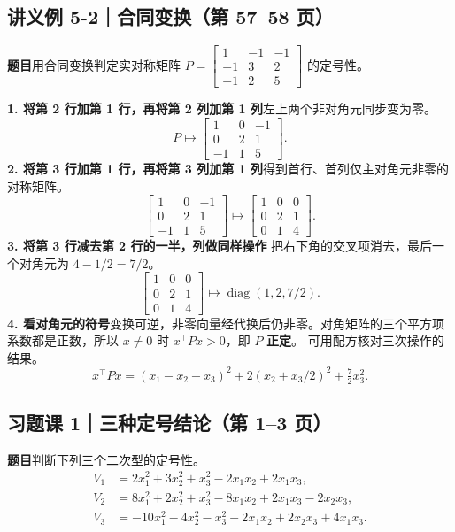 \documentclass[UTF8,a4paper,11pt,fontset=fandol]{ctexart}
\begin{document}
\subsection*{讲义例 5-2｜合同变换（第 57--58 页）}

\textbf{题目}\quad 用合同变换判定实对称矩阵 $P=\begin{bmatrix}1&-1&-1\\-1&3&2\\-1&2&5\end{bmatrix}$ 的定号性。

\textbf{1. 将第 2 行加第 1 行，再将第 2 列加第 1 列}\quad 左上两个非对角元同步变为零。
\[
  P\longmapsto
  \begin{bmatrix}1&0&-1\\0&2&1\\-1&1&5\end{bmatrix}.
\]
\textbf{2. 将第 3 行加第 1 行，再将第 3 列加第 1 列}\quad 得到首行、首列仅主对角元非零的对称矩阵。
\[
  \begin{bmatrix}1&0&-1\\0&2&1\\-1&1&5\end{bmatrix}
  \longmapsto
  \begin{bmatrix}1&0&0\\0&2&1\\0&1&4\end{bmatrix}.
\]
\textbf{3. 将第 3 行减去第 2 行的一半，列做同样操作}\quad
把右下角的交叉项消去，最后一个对角元为 $4-1/2=7/2$。
\[
  \begin{bmatrix}1&0&0\\0&2&1\\0&1&4\end{bmatrix}
  \longmapsto \operatorname{diag}(1,2,7/2).
\]
\textbf{4. 看对角元的符号}\quad 变换可逆，非零向量经代换后仍非零。对角矩阵的三个平方项系数都是正数，所以 $x\ne 0$ 时 $x^\top P x>0$，即 $P$ \textbf{正定}。
可用配方核对三次操作的结果。
\[
  x^\top Px=(x_1-x_2-x_3)^2+2(x_2+x_3/2)^2+\tfrac72x_3^2.
\]

\newpage
\subsection*{习题课 1｜三种定号结论（第 1--3 页）}\label{prob:exercise1}

\textbf{题目}\quad 判断下列三个二次型的定号性。
\[
\begin{aligned}
  V_1&=2x_1^2+3x_2^2+x_3^2-2x_1x_2+2x_1x_3,\\
  V_2&=8x_1^2+2x_2^2+x_3^2-8x_1x_2+2x_1x_3-2x_2x_3,\\
  V_3&=-10x_1^2-4x_2^2-x_3^2-2x_1x_2+2x_2x_3+4x_1x_3.
\end{aligned}
\]
\end{document}
